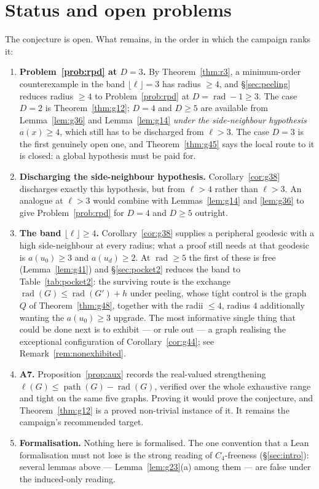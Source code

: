 \documentclass[11pt]{article}
\theoremstyle{plain}
\theoremstyle{definition}
\theoremstyle{remark}
\numberwithin{equation}{section}
\newcommand{\rad}{\operatorname{rad}}
\newcommand{\pth}{\operatorname{path}}
\begin{document}
\section{Status and open problems}\label{sec:open}

The conjecture is open. What remains, in the order in which the campaign ranks it:

\begin{enumerate}
\item \textbf{Problem~\ref{prob:rpd} at $D = 3$.} By Theorem~\ref{thm:r3}, a minimum-order
counterexample in the band $\lfloor\ell\rfloor = 3$ has radius $\ge 4$, and
\S\ref{sec:peeling} reduces radius $\ge 4$ to Problem~\ref{prob:rpd} at $D = \rad - 1 \ge 3$.
The case $D = 2$ is Theorem~\ref{thm:g12}; $D = 4$ and $D \ge 5$ are available from
Lemma~\ref{lem:g36} and Lemma~\ref{lem:g14} \emph{under the side-neighbour hypothesis}
$a(x)\ge 4$, which still has to be discharged from $\ell > 3$. The case $D = 3$ is the first
genuinely open one, and Theorem~\ref{thm:g45} says the local route to it is closed: a global
hypothesis must be paid for.

\item \textbf{Discharging the side-neighbour hypothesis.} Corollary~\ref{cor:g38} discharges
exactly this hypothesis, but from $\ell > 4$ rather than $\ell > 3$. An analogue at
$\ell > 3$ would combine with Lemmas~\ref{lem:g14} and \ref{lem:g36} to give
Problem~\ref{prob:rpd} for $D = 4$ and $D \ge 5$ outright.

\item \textbf{The band $\lfloor\ell\rfloor \ge 4$.} Corollary~\ref{cor:g38} supplies a
peripheral geodesic with a high side-neighbour at every radius; what a proof still needs at
that geodesic is $a(u_0)\ge 3$ and $a(u_d)\ge 2$. At $\rad \ge 5$ the first of these is
free (Lemma~\ref{lem:g41}) and \S\ref{sec:pocket2} reduces the band to Table~\ref{tab:pocket2}:
the surviving route is the exchange $\rad(G)\le \rad(G')+h$ under peeling, whose tight
control is the graph $Q$ of Theorem~\ref{thm:g48}, together with the radii $\le 4$, radius
$4$ additionally wanting the $a(u_0)\ge 3$ upgrade. The most informative single thing that
could be done next is to exhibit --- or rule out --- a graph realising the exceptional
configuration of Corollary~\ref{cor:g44}; see Remark~\ref{rem:nonexhibited}.

\item \textbf{A7.} Proposition~\ref{prop:aux} records the real-valued strengthening
$\ell(G)\le \pth(G)-\rad(G)$, verified over the whole exhaustive range and tight on the same
five graphs. Proving it would prove the conjecture, and Theorem~\ref{thm:g12} is a proved
non-trivial instance of it. It remains the campaign's recommended target.

\item \textbf{Formalisation.} Nothing here is formalised. The one convention that a Lean
formalisation must not lose is the strong reading of $C_4$-freeness (\S\ref{sec:intro}):
several lemmas above --- Lemma~\ref{lem:g23}(a) among them --- are false under the
induced-only reading.
\end{enumerate}
\end{document}
